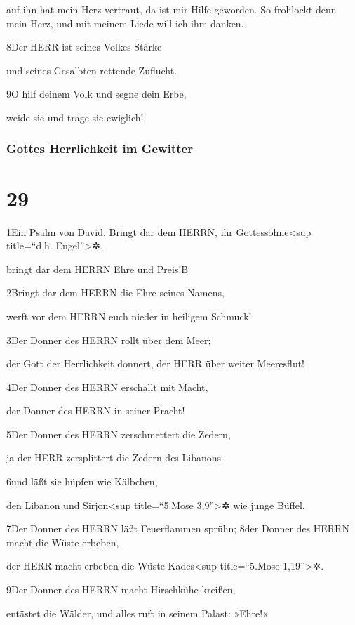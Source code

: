 auf ihn hat mein Herz vertraut, da ist mir Hilfe geworden. So frohlockt
denn mein Herz, und mit meinem Liede will ich ihm danken.

8Der HERR ist seines Volkes Stärke

und seines Gesalbten rettende Zuflucht.

9O hilf deinem Volk und segne dein Erbe,

weide sie und trage sie ewiglich!

\hypertarget{gottes-herrlichkeit-im-gewitter}{%
\subsubsection{Gottes Herrlichkeit im
Gewitter}\label{gottes-herrlichkeit-im-gewitter}}

\hypertarget{section-28}{%
\section{29}\label{section-28}}

1Ein Psalm von David. Bringt dar dem HERRN, ihr Gottessöhne\textless sup
title=``d.h. Engel''\textgreater✲,

bringt dar dem HERRN Ehre und Preis!{B}

2Bringt dar dem HERRN die Ehre seines Namens,

werft vor dem HERRN euch nieder in heiligem Schmuck!

3Der Donner des HERRN rollt über dem Meer;

der Gott der Herrlichkeit donnert, der HERR über weiter Meeresflut!

4Der Donner des HERRN erschallt mit Macht,

der Donner des HERRN in seiner Pracht!

5Der Donner des HERRN zerschmettert die Zedern,

ja der HERR zersplittert die Zedern des Libanons

6und läßt sie hüpfen wie Kälbchen,

den Libanon und Sirjon\textless sup title=``5.Mose 3,9''\textgreater✲
wie junge Büffel.

7Der Donner des HERRN läßt Feuerflammen sprühn; 8der Donner des HERRN
macht die Wüste erbeben,

der HERR macht erbeben die Wüste Kades\textless sup title=``5.Mose
1,19''\textgreater✲.

9Der Donner des HERRN macht Hirschkühe kreißen,

entästet die Wälder, und alles ruft in seinem Palast: »Ehre!«

